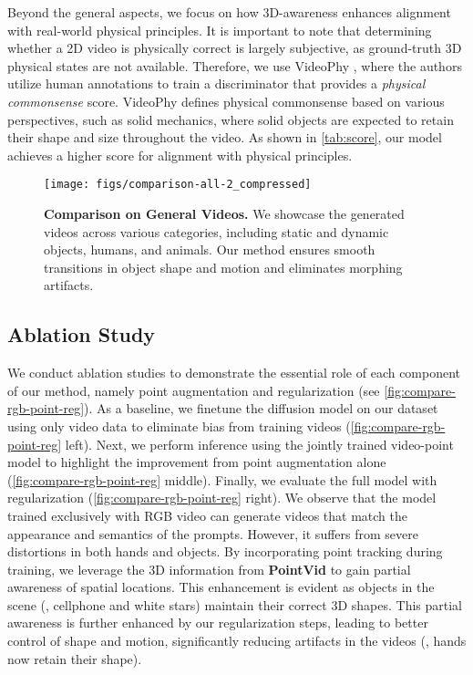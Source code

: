 Beyond the general aspects, we focus on how 3D-awareness enhances alignment with real-world physical principles. It is important to note that determining whether a 2D video is physically correct is largely subjective, as ground-truth 3D physical states are not available. Therefore, we use VideoPhy \cite{bansal2024videophy}, where the authors utilize human annotations to train a discriminator that provides a \textit{physical commonsense} score. VideoPhy defines physical commonsense based on various perspectives, such as solid mechanics, where solid objects are expected to retain their shape and size throughout the video. As shown in \autoref{tab:score}, our model achieves a higher score for alignment with physical principles.
\begin{figure*}[h]
\texttt{[image: figs/comparison-all-2\_compressed]}
\caption{\textbf{Comparison on General Videos.} We showcase the generated videos across various categories, including static and dynamic objects, humans, and animals. Our method ensures smooth transitions in object shape and motion and eliminates morphing artifacts.}\label{fig:compare-all-2}
\end{figure*}


\subsection{Ablation Study}
We conduct ablation studies to demonstrate the essential role of each component of our method, namely point augmentation and regularization (see \autoref{fig:compare-rgb-point-reg}). As a baseline, we finetune the diffusion model on our dataset using only video data to eliminate bias from training videos (\autoref{fig:compare-rgb-point-reg} left). Next, we perform inference using the jointly trained video-point model to highlight the improvement from point augmentation alone (\autoref{fig:compare-rgb-point-reg} middle). Finally, we evaluate the full model with regularization (\autoref{fig:compare-rgb-point-reg} right). We observe that the model trained exclusively with RGB video can generate videos that match the appearance and semantics of the prompts. However, it suffers from severe distortions in both hands and objects. By incorporating point tracking during training, we leverage the 3D information from \textbf{PointVid} to gain partial awareness of spatial locations. This enhancement is evident as objects in the scene (\eg, cellphone and white stars) maintain their correct 3D shapes. This partial awareness is further enhanced by our regularization steps, leading to better control of shape and motion, significantly reducing artifacts in the videos (\eg, hands now retain their shape).




